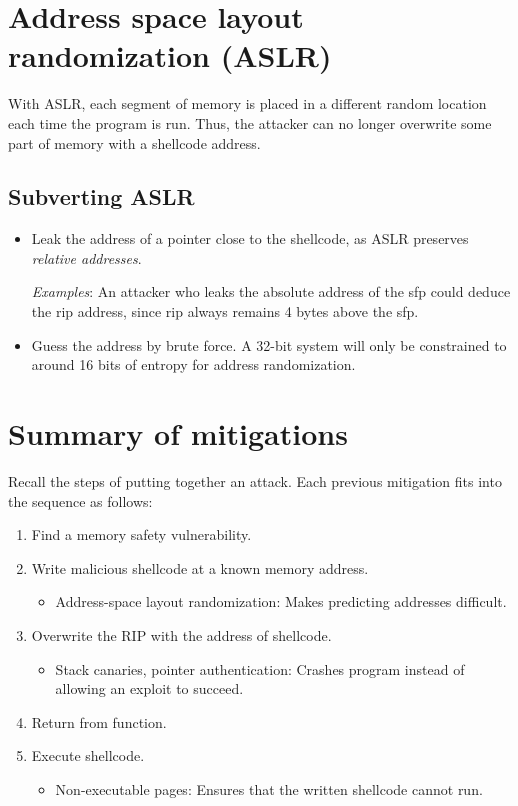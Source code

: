 \section{Address space layout randomization (ASLR)}
With ASLR, each segment of memory is placed in a different random location each time the program is run. Thus, the attacker can no longer overwrite some part of memory with a shellcode address.

\subsection{Subverting ASLR}
\begin{itemize}
    \item Leak the address of a pointer close to the shellcode, as ASLR preserves \emph{relative addresses}.
    
    \emph{Examples}: An attacker who leaks the absolute address of the sfp could deduce the rip address, since rip always remains 4 bytes above the sfp.
    
    \item Guess the address by brute force. A 32-bit system will only be constrained to around 16 bits of entropy for address randomization.
\end{itemize}

\section{Summary of mitigations}
Recall the steps of putting together an attack. Each previous mitigation fits into the sequence as follows:

\begin{enumerate}
    \item Find a memory safety vulnerability.
    
    \item Write malicious shellcode at a known memory address.
    \begin{itemize}
        \item Address-space layout randomization: Makes predicting addresses difficult.
    \end{itemize}
    \item Overwrite the RIP with the address of shellcode.
    \begin{itemize}
        \item Stack canaries, pointer authentication: Crashes program instead of allowing an exploit to succeed.
    \end{itemize}
    \item Return from function.
    \item Execute shellcode.
    \begin{itemize}
        \item Non-executable pages: Ensures that the written shellcode cannot run.
    \end{itemize}
\end{enumerate}


